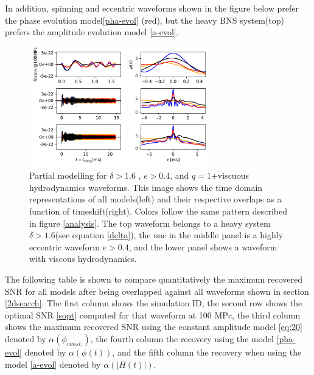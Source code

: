 In addition, spinning and eccentric waveforms shown in the figure below prefer the phase evolution model\ref{pha-evol} (red), but the heavy BNS system(top) prefers the amplitude evolution model \ref{a-evol}.

\begin{figure}[hbt!]
\begin{center}
\includegraphics[width=0.7\textwidth, angle=0]{images/Data_analysis/results/phi-A2.pdf}
\captionsetup{width=0.8\textwidth}
\caption[Partial modelling for $\delta>1.6$ , $e>0.4$, and $q=1$+viscuous hydrodynamics waveforms]{Partial modelling for $\delta>1.6$ , $e>0.4$, and $q=1$+viscuous hydrodynamics waveforms. This image shows the time domain representations of all models(left) and their respective overlaps as a function of timeshift(right). Colors follow the same pattern described in figure \ref{analysis}. The top waveform belongs to a heavy system $\delta>1.6$(see equation \ref{delta}), the one in the middle panel is a highly eccentric waveform $e>0.4$, and the lower panel shows a waveform with viscous hydrodynamics.}
\end{center}
\end{figure}
\FloatBarrier

The following table is shown to compare quantitatively the maximum recovered SNR for all models after being overlapped against all waveforms shown in section \ref{2dsearch}. The first column shows the simulation ID, the second row shows the optimal SNR \ref{sopt} computed for that waveform at 100 MPc, the third column shows the maximum recovered SNR using the constant amplitude model \ref{eq:20} denoted by $\alpha(\phi_{const.})$, the fourth column the recovery using the model \ref{pha-evol} denoted by $\alpha(\phi(t))$, and the fifth column the recovery when using the model \ref{a-evol} denoted by $\alpha(|H(t)|)$.


